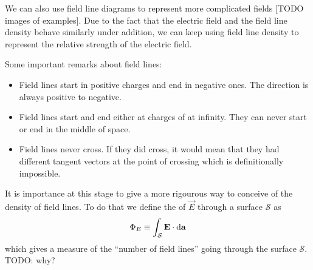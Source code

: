 We can also use field line diagrams to represent more complicated fields [TODO images of examples]. Due to the fact that the electric field and the field line density behave similarly under addition, we can keep using field line density to represent the relative strength of the electric field.

Some important remarks about field lines:
\begin{itemize}
\item Field lines start in positive charges and end in negative ones. The direction is always positive to negative.
\item Field lines start and end either at charges of at infinity. They can never start or end in the middle of space.
\item Field lines never cross. If they did cross, it would mean that they had different tangent vectors at the point of crossing which is definitionally impossible.
\end{itemize}

It is importance at this stage to give a more rigourous way to conceive of the density of field lines. To do that we define the  of $\vec{E}$ through a surface $\mathcal{S}$ as
\[ \Phi_E \equiv \int_\mathcal{S} \bm{\mathrm{E}}\cdot \operatorname{d \!}{\bm{\mathrm{a}}} \]
which gives a measure of the ``number of field lines'' going through the surface $\mathcal{S}$. TODO: why?

